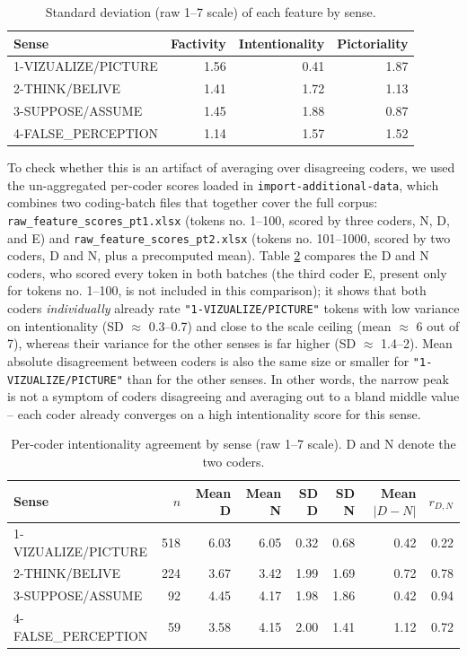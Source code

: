 \documentclass[
]{article}
\begin{document}
\begin{table}[H]
\centering
\caption{\label{tab:unnamed-chunk-5}Standard deviation (raw 1--7 scale) of each feature by sense.\label{tab:sdByFeature}}
\centering
\begin{tabular}[t]{lrrr}
\toprule
Sense & Factivity & Intentionality & Pictoriality\\
\midrule
1-VIZUALIZE/PICTURE & 1.56 & 0.41 & 1.87\\
2-THINK/BELIVE & 1.41 & 1.72 & 1.13\\
3-SUPPOSE/ASSUME & 1.45 & 1.88 & 0.87\\
4-FALSE\_PERCEPTION & 1.14 & 1.57 & 1.52\\
\bottomrule
\end{tabular}
\end{table}

To check whether this is an artifact of averaging over disagreeing
coders, we used the un-aggregated per-coder scores loaded in
\texttt{import-additional-data}, which combines two coding-batch files
that together cover the full corpus:
\texttt{raw\_feature\_scores\_pt1.xlsx} (tokens no. 1--100, scored by
three coders, N, D, and E) and \texttt{raw\_feature\_scores\_pt2.xlsx}
(tokens no. 101--1000, scored by two coders, D and N, plus a precomputed
mean). Table \ref{tab:coderAgreement} compares the D and N coders, who
scored every token in both batches (the third coder E, present only for
tokens no. 1--100, is not included in this comparison); it shows that
both coders \emph{individually} already rate
\texttt{"1-VIZUALIZE/PICTURE"} tokens with low variance on
intentionality (SD \(\approx\) 0.3--0.7) and close to the scale ceiling
(mean \(\approx\) 6 out of 7), whereas their variance for the other
senses is far higher (SD \(\approx\) 1.4--2). Mean absolute disagreement
between coders is also the same size or smaller for
\texttt{"1-VIZUALIZE/PICTURE"} than for the other senses. In other
words, the narrow peak is not a symptom of coders disagreeing and
averaging out to a bland middle value -- each coder already converges on
a high intentionality score for this sense.

\begin{table}[H]
\centering
\caption{\label{tab:unnamed-chunk-7}Per-coder intentionality agreement by sense (raw 1--7 scale). D and N denote the two coders.\label{tab:coderAgreement}}
\centering
\begin{tabular}[t]{lrrrrrrr}
\toprule
Sense & $n$ & Mean D & Mean N & SD D & SD N & Mean $|D-N|$ & $r_{D,N}$\\
\midrule
1-VIZUALIZE/PICTURE & 518 & 6.03 & 6.05 & 0.32 & 0.68 & 0.42 & 0.22\\
2-THINK/BELIVE & 224 & 3.67 & 3.42 & 1.99 & 1.69 & 0.72 & 0.78\\
3-SUPPOSE/ASSUME & 92 & 4.45 & 4.17 & 1.98 & 1.86 & 0.42 & 0.94\\
4-FALSE\_PERCEPTION & 59 & 3.58 & 4.15 & 2.00 & 1.41 & 1.12 & 0.72\\
\bottomrule
\end{tabular}
\end{table}
\end{document}
